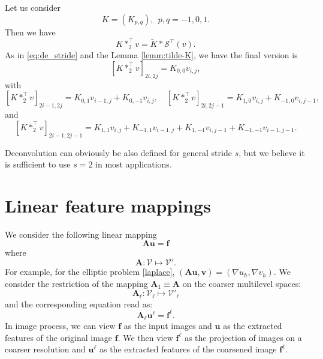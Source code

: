 \begin{theorem}\label{thm:deconv_op}

Let us consider 
\begin{equation}
K=(K_{p,q}),~~p,q = -1, 0, 1.
\end{equation}
Then we have 
$$
K \ast_2^\top v = \tilde K \ast \mathcal S^\top (v).
$$
As in \eqref{eq:de_stride} and the Lemma \ref{lemm:tilde-K}, we have the 
final version is 
\begin{equation}
\label{eq:7}
[K \ast_2^\top v ]_{2i,2j}=  K_{0,0}v_{i,j},
\end{equation}
with 
\begin{equation}
\label{eq:9}
[K \ast_2^\top v ]_{2i-1, 2j} = K_{0,1}v_{i-1,j} + K_{0,-1}v_{i,j}, \quad 
[K \ast_2^\top v ]_{2i, 2j-1} = K_{1,0}v_{i,j} + K_{-1,0}v_{i,j-1},
\end{equation}
and
\begin{equation}
[K \ast_2^\top v ]_{2i-1, 2j-1}  =  
K_{1,1}v_{i,j} + K_{-1,1}v_{i-1,j} + K_{1,-1}v_{i,j-1} + K_{-1,-1}v_{i-1,j-1}.
\end{equation}
\end{theorem}
\begin{remark}
Deconvolution can obviously be also defined for general stride $s$, but we believe it is sufficient to use $s=2$
in most applications. 
\end{remark}

 
\section{Linear feature mappings}
We consider the following linear mapping
\begin{equation}
  \label{feature-map}
\mathbf A\mathbf u=\mathbf  f  
\end{equation}
where 
\begin{equation}
  \label{map-A}
\mathbf A: \mathcal V\mapsto \mathcal V'.
\end{equation}
For example, for the elliptic problem \eqref{laplace}, $(\mathbf A \mathbf u, \mathbf v)=(\nabla u_h, \nabla v_h)$.
We consider the restriction of the mapping $\mathbf A_1\equiv \mathbf A$ on the coarser multilevel spaces:
\begin{equation}
  \label{map-A-ell}
\mathbf A_{\ell}: \mathcal V_\ell\mapsto \mathcal V'_\ell
\end{equation}
and the corresponding equation read as:
\begin{equation}
  \label{feature-map-ell}
\mathbf A_\ell \mathbf u^\ell=\mathbf f^\ell.
\end{equation}
In image process, we can view $\mathbf f$ as the input images and $\mathbf u$ as the extracted features of the original image $\mathbf f$.  We then view $\mathbf f^\ell$ as the projection of images on a coarser resolution and $\mathbf u^\ell$ as the extracted features of the coarsened image $\mathbf f^\ell$.

